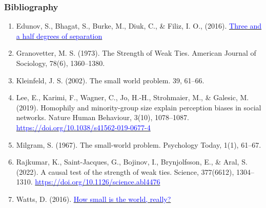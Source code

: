 \documentclass[aspectratio=169]{beamer}
\begin{document}

\begin{frame}
   \frametitle{Bibliography}
   \footnotesize
   \begin{enumerate}
      \item Edunov, S., Bhagat, S., Burke, M., Diuk, C., \& Filiz, I. O., (2016). \href{https://research.facebook.com/blog/2016/2/three-and-a-half-degrees-of-separation/}{\textcolor{blue}{Three and a half degrees of separation}}
      \item Granovetter, M. S. (1973). The Strength of Weak Ties. American
      Journal of Sociology, 78(6), 1360–1380.
      \item Kleinfeld, J. S. (2002). The small world problem. 39, 61–66.
      \item Lee, E., Karimi, F., Wagner, C., Jo, H.-H., Strohmaier, M., \&
      Galesic, M. (2019). Homophily and minority-group size explain perception
      biases in social networks. Nature Human Behaviour, 3(10), 1078–1087.
      \href{https://doi.org/10.1038/s41562-019-0677-4}{\textcolor{blue}{https://doi.org/10.1038/s41562-019-0677-4}}
      \item Milgram, S. (1967). The small-world problem. Psychology Today, 1(1), 61–67.
      \item Rajkumar, K., Saint-Jacques, G., Bojinov, I., Brynjolfsson, E., \&
      Aral, S. (2022). A causal test of the strength of weak ties. Science,
      377(6612), 1304–1310. \href{https://doi.org/10.1126/science.abl4476}{\textcolor{blue}{https://doi.org/10.1126/science.abl4476}}
      \item Watts, D. (2016). \href{https://medium.com/@duncanjwatts/how-small-is-the-world-really-736fa21808ba}{\textcolor{blue}{How small is the world, really?}}
   \end{enumerate}
\end{frame}
\end{document}
